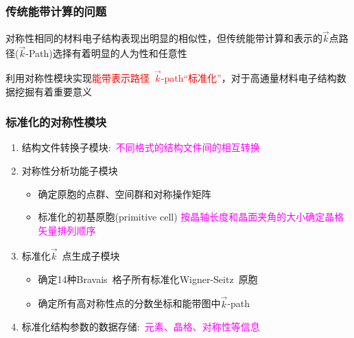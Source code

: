 \documentclass[cjk,slidestop,handout,compress,mathserif,blue]{beamer}	%
\newcommand{\upcite}[1]{\hspace{0ex}\textsuperscript{\cite{#1}}} %
\begin{document}
\frame
{
	\frametitle{传统能带计算的问题}
	对称性相同的材料电子结构表现出明显的相似性，但传统能带计算和表示的$\vec k$点路径($\vec k$-\textrm{Path})选择有着明显的人为性和任意性
\begin{figure}[h!]
\centering
\hspace*{-0.30in}
\label{Band_Gap_BCC_GeF4}
\end{figure}
利用对称性模块实现\textcolor{red}{能带表示路径~$\vec k$-\textrm{path}“标准化”}，对于高通量材料电子结构数据挖掘有着重要意义
}

\frame
{
	\frametitle{标准化的对称性模块}
\begin{enumerate}
   \setlength{\itemsep}{20pt}
	\item 结构文件转换子模块:~\textcolor{magenta}{不同格式的结构文件间的相互转换}
	\item 对称性分析功能子模块
		\begin{itemize}
			\item 确定原胞的点群、空间群和对称操作矩阵
			\item 标准化的初基原胞(\textrm{primitive cell})
				\vskip 2pt
				\textcolor{magenta}{按晶轴长度和晶面夹角的大小确定晶格矢量排列顺序}
		\end{itemize}
	\item 标准化$\vec k$~点生成子模块\upcite{CMS49-299_2010}
		\begin{itemize}
			\item 确定14种\textrm{Bravais~}格子所有标准化\textrm{Wigner-Seitz~}原胞
			\item 确定所有高对称性点的分数坐标和能带图中$\vec k$-\textrm{path}
		\end{itemize}
	\item 标准化结构参数的数据存储:~\textcolor{magenta}{元素、晶格、对称性等信息}
\end{enumerate}
}
\end{document}
